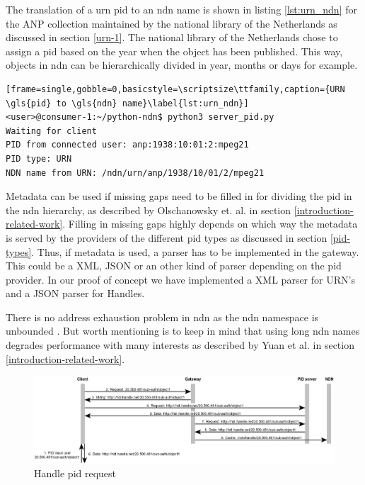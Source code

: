 The translation of a \gls{urn} \gls{pid} to an \gls{ndn} name is shown in listing \ref{lst:urn_ndn} for the ANP collection maintained by the national library of the Netherlands as discussed in section \ref{urn-1}. The national library of the Netherlands chose to assign a \gls{pid} based on the year when the object has been published. 
This way, objects in \gls{ndn} can be hierarchically divided in year, months or days for example.
\vspace{1em}
\begin{lstlisting}[frame=single,gobble=0,basicstyle=\scriptsize\ttfamily,caption={URN \gls{pid} to \gls{ndn} name}\label{lst:urn_ndn}]
<user>@consumer-1:~/python-ndn$ python3 server_pid.py
Waiting for client
PID from connected user: anp:1938:10:01:2:mpeg21
PID type: URN
NDN name from URN: /ndn/urn/anp/1938/10/01/2/mpeg21
\end{lstlisting}

Metadata can be used if missing gaps need to be filled in for dividing the \gls{pid} in the \gls{ndn} hierarchy, as described by Olschanowsky et. al. \cite{ndn-clim} in section \ref{introduction-related-work}. 
Filling in missing gaps highly depends on which way the metadata is served by the providers of the different \gls{pid} types as discussed in section \ref{pid-types}. Thus, if metadata is used, a parser has to be implemented in the gateway. This could be a XML, JSON or an other kind of parser depending on the \gls{pid} provider. In our proof of concept we have implemented a XML parser for URN's and a JSON parser for Handles.

There is no address exhaustion problem in \gls{ndn} as the \gls{ndn} namespace is unbounded \cite{ndn-nspace}. But worth mentioning is to keep in mind that using long \gls{ndn} names degrades performance with many interests as described by Yuan et al. \cite{yuan2012scalable} in section \ref{introduction-related-work}.

\begin{figure}[H]
    \centering
    \includegraphics[width=\textwidth]{Images/pid_seq5.png}
    \caption{Handle \gls{pid} request\label{fig:seq_pid}}
\end{figure}


